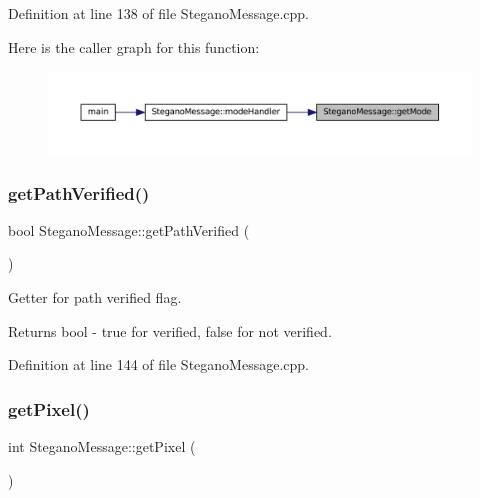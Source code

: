 Definition at line 138 of file Stegano\+Message.\+cpp.

Here is the caller graph for this function\+:\nopagebreak
\begin{figure}[H]
\begin{center}
\leavevmode
\includegraphics[width=350pt]{classSteganoMessage_a7dc660e6d2c8f162636f789cfedde67e_icgraph}
\end{center}
\end{figure}
\mbox{\label{classSteganoMessage_ace172144e49a4da69b890958b3b8089b}} 
\subsubsection{\texorpdfstring{getPathVerified()}{getPathVerified()}}
{\footnotesize\ttfamily bool Stegano\+Message\+::get\+Path\+Verified (\begin{DoxyParamCaption}{ }\end{DoxyParamCaption})}



Getter for path verified flag. 

\begin{DoxyReturn}{Returns}
bool -\/ true for verified, false for not verified. 
\end{DoxyReturn}


Definition at line 144 of file Stegano\+Message.\+cpp.

\mbox{\label{classSteganoMessage_a12231d3596b90fe4c6d67bd694b27d07}} 
\subsubsection{\texorpdfstring{getPixel()}{getPixel()}}
{\footnotesize\ttfamily int Stegano\+Message\+::get\+Pixel (\begin{DoxyParamCaption}{ }\end{DoxyParamCaption})\hspace{0.3cm}{\ttfamily [private]}}



